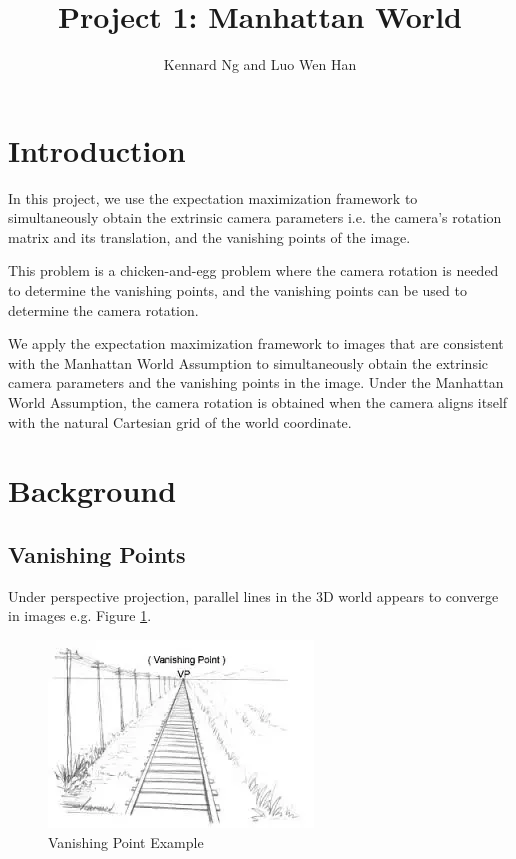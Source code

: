 \documentclass[a4paper]{article}
\author{Kennard Ng and Luo Wen Han}
\title{Project 1: Manhattan World}
\begin{document}
	\maketitle
	\section{Introduction}
	
	In this project, we use the expectation maximization framework to simultaneously obtain the extrinsic camera parameters i.e. the camera's rotation matrix and its translation, and the vanishing points of the image. 
	
	This problem is a chicken-and-egg problem where the camera rotation is needed to determine the vanishing points, and the vanishing points can be used to determine the camera rotation. 
	
	We apply the expectation maximization framework to images that are consistent with the Manhattan World Assumption to simultaneously obtain the extrinsic camera parameters and the vanishing points in the image. Under the Manhattan World Assumption, the camera rotation is obtained when the camera aligns itself with the natural Cartesian grid of the world coordinate. 
	
	\section{Background}
	
	\subsection{Vanishing Points}
	
	Under perspective projection, parallel lines in the 3D world appears to converge in images e.g. Figure \ref{fig:vp_eg}.
	
	\begin{figure}[ht]
		\centering
		\includegraphics[width=0.5\linewidth]{images/vp_eg}
		\caption{Vanishing Point Example}
		\label{fig:vp_eg}
	\end{figure}
\end{document}
